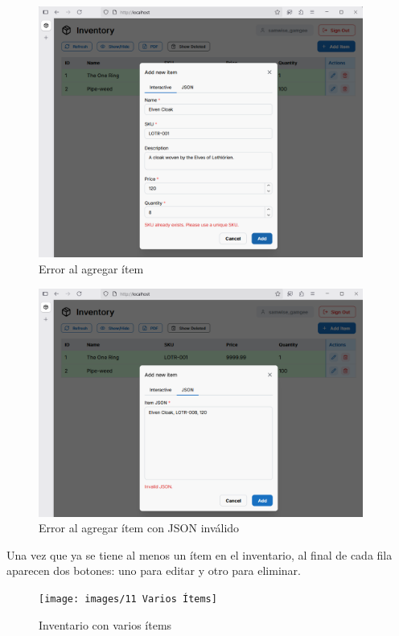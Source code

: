 \begin{figure}[H]
    \centering
    \includegraphics[width=0.95\textwidth]{images/9 Agregar Error}
    \caption{Error al agregar ítem}
\end{figure}
\begin{figure}[H]
    \centering
    \includegraphics[width=0.95\textwidth]{images/10 Agregar Error JSOn}
    \caption{Error al agregar ítem con JSON inválido}
\end{figure}

Una vez que ya se tiene al menos un ítem en el inventario, al final de cada fila aparecen dos botones: uno para editar y otro para eliminar.

\begin{figure}[H]
    \centering
    \texttt{[image: images/11 Varios Ítems]}
    \caption{Inventario con varios ítems}
\end{figure}


